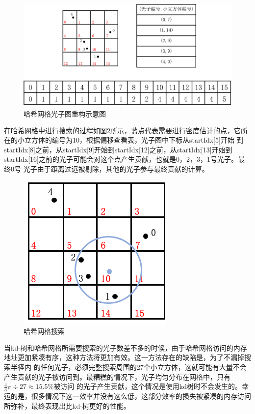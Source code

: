\documentclass[UTF8]{ctexart}
\begin{document}
        \begin{figure}[htbp]
            \centering
            \includegraphics[scale=0.6]{pic/HashGridPhotonRebuild.png}
            \caption{哈希网格光子图重构示意图}
            \label{fig:1}
        \end{figure}
        
        在哈希网格中进行搜索的过程如图\ref{fig:2}所示，蓝点代表需要进行密度估计的点，它所在的小立方体的编号为10，根据偏移查看表，光子图中下标从startIdx[5]开始
        到startIdx[8]之前，从startIdx[9]开始到startIdx[12]之前，从startIdx[13]开始到startIdx[16]之前的光子可能会对这个点产生贡献，也就是0，2，3，1号光子。最终0号
        光子由于距离过远被剔除，其他的光子参与最终贡献的计算。
        
        \begin{figure}[htbp]
        \centering
        \includegraphics[scale=0.6]{pic/HashGridSearch.png}
        \caption{哈希网格搜索}
        \label{fig:2}
        \end{figure}
        
        当kd-树和哈希网格所需要搜索的光子数差不多的时候，由于哈希网格访问的内存地址更加紧凑有序，这种方法将更加有效。这一方法存在的缺陷是，为了不漏掉搜索半径内
        的任何光子，必须完整搜索周围的27个小立方体，这就可能有大量不会产生贡献的光子被访问到。最糟糕的情况下，光子均匀分布在网格中，只有$\frac{4}{3}\pi\div27\approx15.5\%$被访问
        的光子产生贡献，这个情况是使用kd树时不会发生的。幸运的是，很多情况下这一效率并没有这么低，这部分效率的损失被紧凑的内存访问所弥补，最终表现出比kd-树更好的性能。
        
\end{document}
